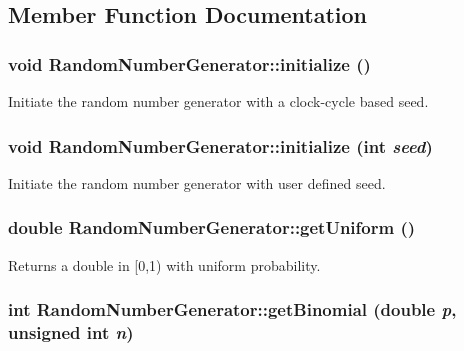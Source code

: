 \subsection{Member Function Documentation}
\subsubsection{\setlength{\rightskip}{0pt plus 5cm}void RandomNumberGenerator::initialize ()\hspace{0.3cm}{\tt  [static]}}\label{classRandomNumberGenerator_7f9ac1a577f5f72fd07b5e769f232fbe}


Initiate the random number generator with a clock-cycle based seed. 

\subsubsection{\setlength{\rightskip}{0pt plus 5cm}void RandomNumberGenerator::initialize (int {\em seed})\hspace{0.3cm}{\tt  [static]}}\label{classRandomNumberGenerator_16d763e85961dddeeebee1be0fc8a3a2}


Initiate the random number generator with user defined seed. 

\subsubsection{\setlength{\rightskip}{0pt plus 5cm}double RandomNumberGenerator::getUniform ()\hspace{0.3cm}{\tt  [inline, static]}}\label{classRandomNumberGenerator_4f452a69c4f0fd0044979e3eea6ef358}


Returns a double in [0,1) with uniform probability. 

\subsubsection{\setlength{\rightskip}{0pt plus 5cm}int RandomNumberGenerator::getBinomial (double {\em p}, \/  unsigned int {\em n})\hspace{0.3cm}{\tt  [inline, static]}}\label{classRandomNumberGenerator_fbb6020f2d5d13d08ce12256370d6408}


